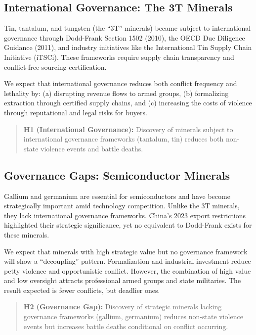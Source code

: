\documentclass[11pt]{article}
\begin{document}
\subsection{International Governance: The 3T Minerals}

Tin, tantalum, and tungsten (the ``3T'' minerals) became subject to international governance through Dodd-Frank Section 1502 (2010), the OECD Due Diligence Guidance (2011), and industry initiatives like the International Tin Supply Chain Initiative (iTSCi). These frameworks require supply chain transparency and conflict-free sourcing certification.

We expect that international governance reduces both conflict frequency and lethality by: (a) disrupting revenue flows to armed groups, (b) formalizing extraction through certified supply chains, and (c) increasing the costs of violence through reputational and legal risks for buyers.

\begin{quote}
\textbf{H1 (International Governance):} Discovery of minerals subject to international governance frameworks (tantalum, tin) reduces both non-state violence events and battle deaths.
\end{quote}

\subsection{Governance Gaps: Semiconductor Minerals}

Gallium and germanium are essential for semiconductors and have become strategically important amid technology competition. Unlike the 3T minerals, they lack international governance frameworks. China's 2023 export restrictions highlighted their strategic significance, yet no equivalent to Dodd-Frank exists for these minerals.

We expect that minerals with high strategic value but no governance framework will show a ``decoupling'' pattern. Formalization and industrial investment reduce petty violence and opportunistic conflict. However, the combination of high value and low oversight attracts professional armed groups and state militaries. The result expected is fewer conflicts, but deadlier ones.

\begin{quote}
\textbf{H2 (Governance Gap):} Discovery of strategic minerals lacking governance frameworks (gallium, germanium) reduces non-state violence events but increases battle deaths conditional on conflict occurring.
\end{quote}
\end{document}
